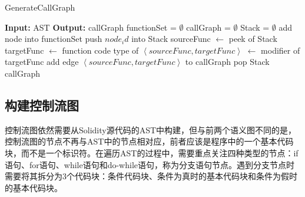 \begin{algorithm}
    \caption{GenerateCallGraph}
    \label{alg:gen_callgraph}
    \begin{algorithmic}[1]
        \State \textbf{Input:} AST
        \State \textbf{Output:} callGraph
        \State functionSet = $\emptyset$
        \State callGraph = $\emptyset$
        \State Stack = $\emptyset$
                \State add node into functionSet
                \State push $node_id$ into Stack
                    \State sourceFunc $\gets$ peek of Stack
                    \State targetFunc $\gets$ function code
                    \State type of $\left\langle sourceFunc,targetFunc\right\rangle$ $\gets$ modifier of targetFunc
                    \State add edge  $\left\langle sourceFunc,targetFunc\right\rangle$ to callGraph
                \EndIf
            \EndIf
                \State {}
            \EndFor
                \State pop Stack
            \EndIf
        \EndFunction
        \State {}
        \State \Return callGraph
    \end{algorithmic}
    \end{algorithm}

\subsection{构建控制流图}
\label{sec:构建控制流图}
控制流图依然需要从Solidity源代码的AST中构建，但与前两个语义图不同的是，控制流图的节点不再与AST中的节点相对应，前者应该是程序中的一个基本代码块，而不是一个标识符。在遍历AST的过程中，需要重点关注四种类型的节点：if语句、for语句、while语句和do-while语句，称为分支语句节点。遇到分支节点时需要将其拆分为3个代码块：条件代码块、条件为真时的基本代码块和条件为假时的基本代码块。

